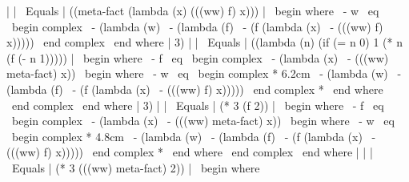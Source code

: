 {| | \ Equals | ((meta-fact (lambda (x)
                 (((ww) f) x))) | \ begin {where}
                                  \ - w { \ eq } \ begin {complex}
                                            \ - (lambda (w)
                                            \ -   (lambda (f)
                                            \ -     (f (lambda (x)
                                            \ -          (((ww) f) x)))))
                                            \ end {complex}
                                  \ end {where} |
    3)
| | \ Equals | ((lambda (n)
      (if (= n 0) 1
          (* n (f (- n 1))))) | \ begin {where}
                                \ - f { \ eq } \ begin {complex}
                                          \ - (lambda (x)
                                          \ -   (((ww) meta-fact) x)) \ begin {where}
                                                         \ - w { \ eq } \ begin {complex *} {6.2cm}
                                                                   \ - (lambda (w)
                                                                   \ -   (lambda (f)
                                                                   \ -     (f (lambda (x)
                                                                   \ -          (((ww) f) x)))))
                                                                   \ end {complex *}
                                                         \ end {where}
                                                  \ end {complex}
                                \ end {where} |
    3)
| | \ Equals | (* 3 (f 2)) | \ begin {where}
                        \ - f { \ eq } \ begin {complex}
                                  \ - (lambda (x)
                                  \ -   (((ww) meta-fact) x)) \ begin {where}
                                                             \ - w { \ eq } \ begin {complex *} {4.8cm}
                                                                       \ - (lambda (w)
                                                                       \ -   (lambda (f)
                                                                       \ -     (f (lambda (x)
                                                                       \ -          (((ww) f) x)))))
                                                                       \ end {complex *}
                                                                      \ end {where}
                                  \ end {complex}
                        \ end {where} |
| | \ Equals | (* 3 (((ww) meta-fact) 2)) | \ begin {where}
}
